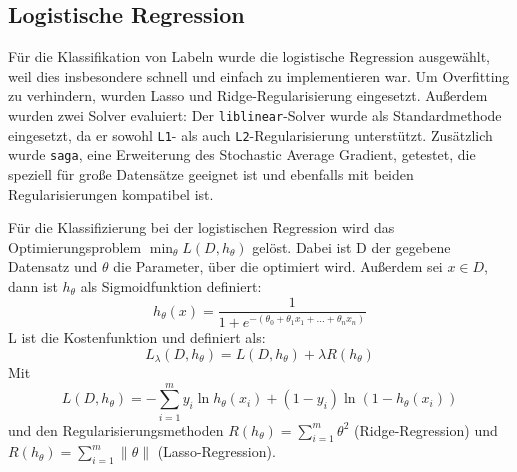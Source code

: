 \subsection{Logistische Regression}
\label{sec:logreg}

Für die Klassifikation von Labeln wurde die logistische Regression ausgewählt, weil dies insbesondere schnell und einfach zu implementieren war. Um Overfitting zu verhindern, wurden Lasso und Ridge-Regularisierung eingesetzt. Außerdem wurden zwei Solver evaluiert: Der \texttt{liblinear}-Solver wurde als Standardmethode eingesetzt, da er sowohl \texttt{L1}- als auch \texttt{L2}-Regularisierung unterstützt. Zusätzlich wurde \texttt{saga}, eine Erweiterung des Stochastic Average Gradient, getestet, die speziell für große Datensätze geeignet ist und ebenfalls mit beiden Regularisierungen kompatibel ist.

Für die Klassifizierung bei der logistischen Regression wird das Optimierungsproblem $\min_\theta L(D,h_\theta)$ gelöst. Dabei ist D der gegebene Datensatz und $\theta$ die Parameter, über die optimiert wird. Außerdem sei $x \in D$, dann ist $h_\theta$ als Sigmoidfunktion definiert:
\begin{equation*}
    h_\theta(x) = \frac{1}{1 + e^{-(\theta_0 + \theta_1 x_1 + \dots + \theta_n x_n)}}
\end{equation*}
L ist die Kostenfunktion und definiert als:
\begin{equation*}
    L_\lambda(D, h_\theta)=L(D,h_\theta)+\lambda R(h_\theta)
\end{equation*}
Mit
\begin{equation*}
    L(D,h_\theta)=- \sum_{i=1}^{m}  y_i \ln h_\theta(x_i) + (1 - y_i) \ln (1 - h_\theta(x_i))
\end{equation*}
und den Regularisierungsmethoden $R(h_\theta)=\sum_{i=1}^m\theta^2$ (Ridge-Regression) und $ R(h_\theta)=\sum_{i=1}^m\|\theta\|$ (Lasso-Regression).
